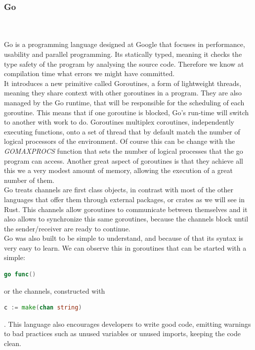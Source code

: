 \documentclass[runningheads]{llncs}
\begin{document}
\subsubsection{Go}\hfill\\\\
Go is a programming language designed at Google that focuses in performance, usability and parallel programming.
Its statically typed, meaning it checks the type safety of the program by analysing the source code. Therefore we know at compilation time what errors we might have committed.\\
It introduces a new primitive called Goroutines, a form of lightweight threads, meaning they share context with other goroutines in a program. They are also managed by the Go runtime, that will be responsible for the scheduling of each goroutine. This means that if one goroutine is blocked, Go's run-time will switch to another with work to do.
Goroutines multiplex coroutines, independently executing functions, onto a set of thread that by default match the number of logical processors of the environment. Of course this can be change with the {\it GOMAXPROCS} function that sets the number of logical processes that the go program can access. Another great aspect of goroutines is that they achieve all this we a very modest amount of memory, allowing the execution of a great number of them.\\
Go treats channels are first class objects, in contrast with most of the other languages that offer them through external packages, or crates as we will see in Rust. This channels allow goroutines to communicate between themselves and it also allows to synchronize this same goroutines, because the channels block until the sender/receiver are ready to continue.\\	
Go was also built to be simple to understand, and because of that its syntax is very easy to learn. We can observe this in goroutines that can be started with a simple:
\begin{lstlisting}[language=Go]
go func()
\end{lstlisting} 
or the channels, constructed with
\begin{lstlisting}[language=Go]
c := make(chan string)
\end{lstlisting}.
This language also encourages developers to write good code, emitting warnings to bad practices such as unused variables or unused imports, keeping the code clean.
\end{document}
